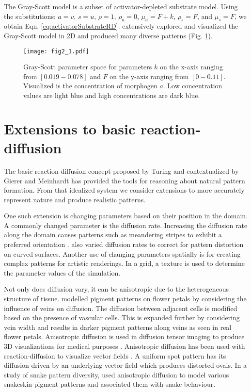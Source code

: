 The Gray-Scott model is a subset of activator-depleted substrate model.	Using the substitutions: $a = v$, $s = u$, $\rho = 1$, $\rho_a = 0$, $\mu_a = F+k$, $\rho_s = F$, and $\mu_s = F$, we obtain Eqn. \ref{eq:activatorSubstrateRD}. \citet{pearson1993} extensively explored and visualized the Gray-Scott model in 2D and produced many diverse patterns (Fig. \ref{fig:grayscottParameterMap}). 

\begin{figure}[H]
	\centering
	\texttt{[image: fig2\_1.pdf]}
	\caption{Gray-Scott parameter space for parameters $k$ on the x-axis ranging from $[0.019 - 0.078]$ and $F$ on the y-axis ranging from $[0 - 0.11]$. Visualized is the concentration of morphogen $a$. Low concentration values are light blue and high concentrations are dark blue.}
	\label{fig:grayscottParameterMap}
\end{figure}

\section{Extensions to basic reaction-diffusion}
The basic reaction-diffusion concept proposed by Turing and contextualized by Gierer and Meinhardt has provided the tools for reasoning about natural pattern formation. From that idealized system we consider extensions to more accurately represent nature and produce realistic patterns.


One such extension is changing parameters based on their position in the domain. A commonly changed parameter is the diffusion rate. Increasing the diffusion rate along the domain causes patterns such as meandering stripes to exhibit a preferred orientation \citep{zheng2009}. \citet{witkin1991} also varied diffusion rates to correct for pattern distortion on curved surfaces. Another use of changing parameters spatially is for creating complex patterns for artistic renderings. In a grid, a texture is used to determine the parameter values of the simulation. 

Not only does diffusion vary, it can be anisotropic due to the heterogeneous structure of tissue. \citet{zhou2007} modelled pigment patterns on flower petals by considering the influence of veins on diffusion. The diffusion between adjacent cells is modified based on the presence of vascular cells. This is expanded further by considering vein width and results in darker pigment patterns along veins as seen in real flower petals. Anisotropic diffusion is used in diffusion tensor imaging to produce 3D visualizations for medical purposes \citep{bihan2001}. Anisotropic diffusion has been used with reaction-diffusion to visualize vector fields \citep{sanderson2004}. A uniform spot pattern has its diffusion driven by an underlying vector field which produces distorted ovals. In a study of snake pattern diversity, \citet{allen2013} used anisotropic diffusion to model various snakeskin pigment patterns and associated them with snake behaviour.


